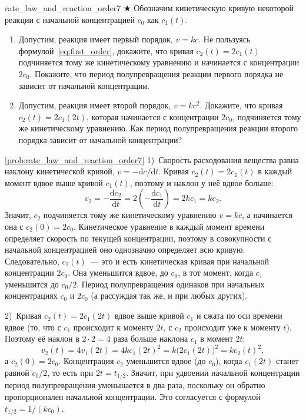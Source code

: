 \begin{problem}{}{rate_law_and_reaction_order7}
    $\bigstar$ Обозначим кинетическую кривую некоторой реакции с начальной концентрацией $c_0$ как $c_1(t)$.
    \begin{enumerate}[label=\arabic*)]
        \item Допустим, реакция имеет первый порядок, $v = kc$. Не пользуясь формулой~\eqref{eq:first_order}, докажите, что кривая $c_2(t) = 2c_1(t)$ подчиняется тому же кинетическому уравнению и начинается с концентрации $2c_0$. Покажите, что период полупревращения реакции первого порядка не зависит от начальной концентрации.
        \item Допустим, реакция имеет второй порядок, $v = kc^2$. Докажите, что кривая $c_2(t) = 2c_1(2t)$, которая начинается с концентрации $2c_0$, подчиняется тому же кинетическому уравнению. Как период полупревращения реакции второго порядка зависит от начальной концентрации?
    \end{enumerate}
    \begin{sol}{\ref{prob:rate_law_and_reaction_order7}}
        1)~Скорость расходования вещества равна наклону кинетической кривой, $v = -\mathrm{d}c/\mathrm{d}t$. Кривая $c_2(t) = 2c_1(t)$ в каждый момент вдвое выше кривой $c_1(t)$, поэтому и наклон у неё вдвое больше:
        \begin{equation*}
            v_2 = -\frac{\mathrm{d}c_2}{\mathrm{d}t} = 2\left(-\frac{\mathrm{d}c_1}{\mathrm{d}t}\right) = 2kc_1 = kc_2.
        \end{equation*}
        Значит, $c_2$ подчиняется тому же кинетическому уравнению $v = kc$, а начинается она с $c_2(0) = 2c_0$. Кинетическое уравнение в каждый момент времени определяет скорость по текущей концентрации, поэтому в совокупности с начальной концентрацией оно однозначно определяет всю кривую. Следовательно, $c_2(t)$~--- это и есть кинетическая кривая при начальной концентрации $2c_0$. Она уменьшится вдвое, до $c_0$, в тот момент, когда $c_1$ уменьшится до $c_0/2$. Период полупревращения одинаков при начальных концентрациях $c_0$ и $2c_0$ (а рассуждая так же, и при любых других).

        2)~Кривая $c_2(t) = 2c_1(2t)$ вдвое выше кривой $c_1$ и сжата по оси времени вдвое (то, что с $c_1$ происходит к моменту $2t$, с $c_2$ происходит уже к моменту $t$). Поэтому её наклон в $2 \cdot 2 = 4$ раза больше наклона $c_1$ в момент $2t$:
        \begin{equation*}
            v_2(t) = 4 v_1(2t) = 4kc_1(2t)^2 = k\bigl(2c_1(2t)\bigr)^2 = kc_2(t)^2,
        \end{equation*}
        а $c_2(0) = 2c_0$. Концентрация $c_2$ уменьшится вдвое (до $c_0$), когда $c_1(2t)$ станет равной $c_0/2$, то есть при $2t = t_{1/2}$. Значит, при удвоении начальной концентрации период полупревращения уменьшается в два раза, поскольку он обратно пропорционален начальной концентрации. Это согласуется с формулой $t_{1/2} = 1/(kc_0)$.
    \end{sol}
\end{problem}

\clearpage